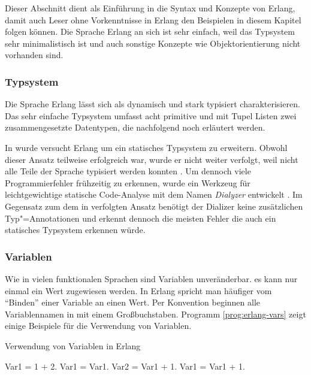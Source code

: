 Dieser Abschnitt dient als Einführung in die Syntax und Konzepte von Erlang, damit auch Leser ohne Vorkenntnisse in Erlang den Beispielen in diesem Kapitel folgen können. Die Sprache Erlang an sich ist sehr einfach, weil das Typsystem sehr minimalistisch ist und auch sonstige Konzepte wie \zB Objektorientierung nicht vorhanden sind.

\subsubsection{Typsystem}

Die Sprache Erlang lässt sich als dynamisch und stark typisiert charakterisieren. Das sehr einfache Typsystem umfasst acht primitive und mit Tupel \bzw Listen zwei zusammengesetzte Datentypen, die nachfolgend noch erläutert werden.

In \cite{Marlow:1997:PSS:258948.258962} wurde versucht Erlang um ein statisches Typsystem zu erweitern. Obwohl dieser Ansatz teilweise erfolgreich war, wurde er nicht weiter verfolgt, weil nicht alle Teile der Sprache typisiert werden konnten \cite[14]{Armstrong:2007:HE:1238844.1238850}. Um dennoch viele Programmierfehler frühzeitig zu erkennen, wurde ein Werkzeug für leichtgewichtige statische Code-Analyse mit dem Namen \textit{Dialyzer} entwickelt \cite{ErlangWarStory}. Im Gegensatz zum dem in \cite{Marlow:1997:PSS:258948.258962} verfolgten Ansatz benötigt der Dializer keine zusätzlichen Typ"=Annotationen und erkennt dennoch die meisten Fehler die auch ein statisches Typsystem erkennen würde.

\subsubsection{Variablen}

Wie in vielen funktionalen Sprachen sind Variablen unveränderbar. \Dah es kann nur einmal ein Wert zugewiesen werden. In Erlang spricht man häufiger vom "`Binden"' einer Variable an einen Wert. Per Konvention beginnen alle Variablennamen in mit einem Großbuchstaben. Programm \ref{prog:erlang-vars} zeigt einige Beispiele für die Verwendung von Variablen.

\begin{program}[!hbt]
\caption{Verwendung von Variablen in Erlang}
\label{prog:erlang-vars}
\begin{ErlangCode}
Var1 = 1 + 2.
Var1 = Var1. %
Var2 = Var1 + 1. %
Var1 = Var1 + 1. %
\end{ErlangCode}
\end{program}

